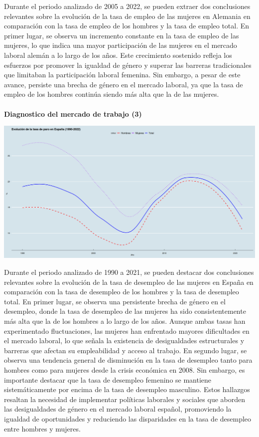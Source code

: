     Durante el periodo analizado de 2005 a 2022, se pueden extraer dos conclusiones relevantes sobre la evolución de la tasa de empleo de las mujeres en Alemania en comparación con la tasa de empleo de los hombres y la tasa de empleo total. En primer lugar, se observa un incremento constante en la tasa de empleo de las mujeres, lo que indica una mayor participación de las mujeres en el mercado laboral alemán a lo largo de los años. Este crecimiento sostenido refleja los esfuerzos por promover la igualdad de género y superar las barreras tradicionales que limitaban la participación laboral femenina. Sin embargo, a pesar de este avance, persiste una brecha de género en el mercado laboral, ya que la tasa de empleo de los hombres continúa siendo más alta que la de las mujeres.\\\\
    

\textbf{Diagnostico del mercado de trabajo (3)}

    \begin{center}
	\includegraphics[scale=.32]{image/b3ej4e.png}
    \end{center}
    \vspace{.5cm}


Durante el periodo analizado de 1990 a 2021, se pueden destacar dos conclusiones relevantes sobre la evolución de la tasa de desempleo de las mujeres en España en comparación con la tasa de desempleo de los hombres y la tasa de desempleo total. En primer lugar, se observa una persistente brecha de género en el desempleo, donde la tasa de desempleo de las mujeres ha sido consistentemente más alta que la de los hombres a lo largo de los años. Aunque ambas tasas han experimentado fluctuaciones, las mujeres han enfrentado mayores dificultades en el mercado laboral, lo que señala la existencia de desigualdades estructurales y barreras que afectan su empleabilidad y acceso al trabajo. En segundo lugar, se observa una tendencia general de disminución en la tasa de desempleo tanto para hombres como para mujeres desde la crisis económica en 2008. Sin embargo, es importante destacar que la tasa de desempleo femenino se mantiene sistemáticamente por encima de la tasa de desempleo masculino. Estos hallazgos resaltan la necesidad de implementar políticas laborales y sociales que aborden las desigualdades de género en el mercado laboral español, promoviendo la igualdad de oportunidades y reduciendo las disparidades en la tasa de desempleo entre hombres y mujeres.\\\\

